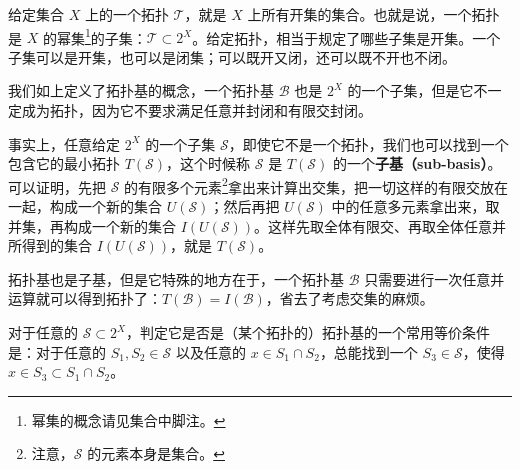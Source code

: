 给定集合 $X$ 上的一个拓扑 $\mathcal{T}$，就是 $X$ 上所有开集的集合。也就是说，一个拓扑是 $X$ 的幂集\footnote{幂集的概念请见集合中脚注。}的子集：$\mathcal{T}\subset 2^X$。给定拓扑，相当于规定了哪些子集是开集。一个子集可以是开集，也可以是闭集；可以既开又闭，还可以既不开也不闭。

我们如上定义了拓扑基的概念，一个拓扑基 $\mathcal{B}$ 也是 $2^X$ 的一个子集，但是它不一定成为拓扑，因为它不要求满足任意并封闭和有限交封闭。

事实上，任意给定 $2^X$ 的一个子集 $\mathcal{S}$，即使它不是一个拓扑，我们也可以找到一个包含它的最小拓扑 $T(\mathcal{S})$，这个时候称 $\mathcal{S}$ 是 $T(\mathcal{S})$ 的一个\textbf{子基（sub-basis）}。可以证明，先把 $\mathcal{S}$ 的有限多个元素\footnote{注意，$\mathcal{S}$ 的元素本身是集合。}拿出来计算出交集，把一切这样的有限交放在一起，构成一个新的集合 $U(\mathcal{S})$；然后再把 $U(\mathcal{S})$ 中的任意多元素拿出来，取并集，再构成一个新的集合 $I(U(\mathcal{S}))$。这样先取全体有限交、再取全体任意并所得到的集合 $I(U(\mathcal{S}))$，就是 $T(\mathcal{S})$。

拓扑基也是子基，但是它特殊的地方在于，一个拓扑基 $\mathcal{B}$ 只需要进行一次任意并运算就可以得到拓扑了：$T(\mathcal{B})=I(\mathcal{B})$，省去了考虑交集的麻烦。

对于任意的 $\mathcal{S}\subset2^X$，判定它是否是（某个拓扑的）拓扑基的一个常用等价条件是：对于任意的 $S_1, S_2\in \mathcal{S}$ 以及任意的 $x\in S_1\cap S_2$，总能找到一个 $S_3\in\mathcal{S}$，使得 $x\in S_3\subset S_1\cap S_2$。
